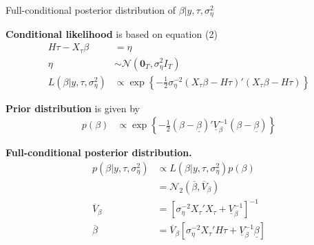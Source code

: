 \documentclass[notes,blackandwhite,mathsans,usenames,dvipsnames]{beamer}
\begin{document}
\begin{frame}{Full-conditional posterior distribution of $\beta|y,\tau,\sigma^2_\eta$}

\small
\bigskip\textbf{Conditional likelihood} {\color{mcxs2}is based on equation} (2)
\begin{align*}
H\tau-X_\tau \beta&=\eta\\
\eta  &\sim\mathcal{N}\left(\mathbf{0}_T, \sigma^2_\eta I_T\right)\\
L\left(\beta|y,\tau,\sigma^2_\eta\right)&\propto\exp\left\{-\frac{1}{2}\sigma^{-2}_\eta\left(X_\tau \beta - H\tau\right)'\left(X_\tau \beta - H\tau\right)  \right\}
\end{align*}

\smallskip\textbf{Prior distribution} {\color{mcxs2}is given by}
\begin{align*}
p(\beta)&\propto \exp\left\{ -\frac{1}{2}(\beta-\underline{\beta})'\underline{V}_\beta^{-1}(\beta-\underline{\beta}) \right\}
\end{align*}

\smallskip\textbf{Full-conditional posterior distribution.}
\begin{align*}
p\left( \beta|y,\tau,\sigma^2_\eta \right) &\propto L\left(\beta|y,\tau,\sigma^2_\eta\right)p(\beta)\\
&= \mathcal{N}_2\left(\overline{\beta},\overline{V}_\beta\right)\\
\overline{V}_\beta &= \left[\sigma^{-2} _\eta X_\tau' X_\tau + \underline{V}_\beta^{-1} \right]^{-1}\\
\overline{\beta} &= \overline{V}_\beta \left[\sigma^{-2} _\eta X_\tau' H \tau + \underline{V}_\beta^{-1}\underline{\beta}  \right]
\end{align*}
\end{frame}
\end{document}
